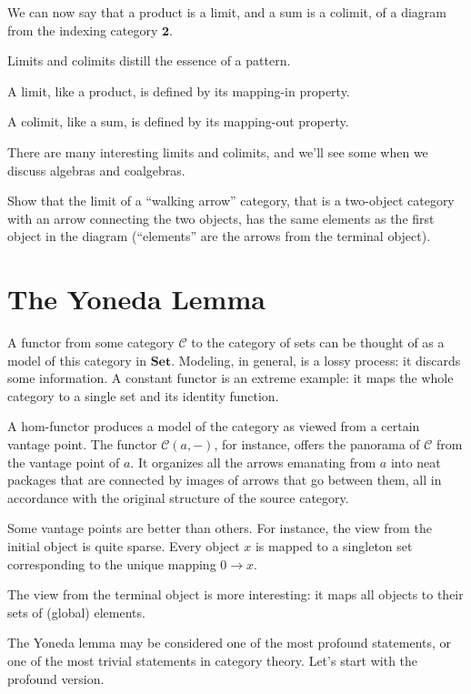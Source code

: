 \documentclass[DaoFP]{subfiles}
\begin{document}
We can now say that a product is a limit, and a sum is a colimit, of a diagram from the indexing category $\mathbf{2}$.

Limits and colimits distill the essence of a pattern. 

A limit, like a product, is defined by its mapping-in property. 

A colimit, like a sum, is defined by its mapping-out property.

There are many interesting limits and colimits, and we'll see some when we discuss algebras and coalgebras.

\begin{exercise}
Show that the limit of a ``walking arrow'' category, that is a two-object category with an arrow connecting the two objects, has the same elements as the first object in the diagram (``elements'' are the arrows from the terminal object).
\end{exercise}

\section{The Yoneda Lemma}

A functor from some category $\mathcal{C}$ to the category of sets can be thought of as a model of this category in $\mathbf{Set}$. Modeling, in general, is a lossy process: it discards some information. A constant functor is an extreme example: it maps the whole category to a single set and its identity function. 

A hom-functor produces a model of the category as viewed from a certain vantage point. The functor $\mathcal{C}(a, -)$, for instance, offers the panorama of $\mathcal{C}$ from the vantage point of $a$. It organizes all the arrows emanating from $a$ into neat packages that are connected by images of arrows that go between them, all in accordance with the original structure of the source category. 

Some vantage points are better than others. For instance, the view from the initial object is quite sparse. Every object $x$ is mapped to a singleton set corresponding to the unique mapping $0 \to x$. 

The view from the terminal object is more interesting: it maps all objects to their sets of (global) elements. 

The Yoneda lemma may be considered one of the most profound statements, or one of the most trivial statements in category theory. Let's start with the profound version. 
\end{document}
